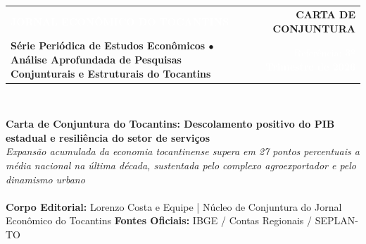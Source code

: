 \documentclass[10pt,a4paper]{article}
\begin{document}
\color{cinzatexto}

\\[-4pt]
\noindent{\color{douradoto}\rule{\textwidth}{1.2pt}}\\[-1pt]
\noindent\colorbox{corprimaria}{%
  \parbox{\dimexpr\textwidth-2\fboxsep\relax}{%
    \vspace{7pt}%
    \begin{tabularx}{\linewidth}{@{}X r@{}}
      {\fontsize{16}{19}\selectfont\textbf{\textcolor{white}{JORNAL ECONÔMICO DO TOCANTINS}}} &
      \colorbox{douradoto}{\textbf{\footnotesize\textcolor{corprimaria}{\hspace{6pt}CARTA DE CONJUNTURA\hspace{6pt}}}} \\[5pt]
      {\footnotesize\textcolor{douradoto}{\textbf{Série Periódica de Estudos Econômicos $\bullet$ Análise Aprofundada de Pesquisas Conjunturais e Estruturais do Tocantins}}} &
      {\footnotesize\textcolor{white}{Referência: \textbf{3º Trimestre de 2026}}}
    \end{tabularx}%
    \vspace{5pt}%
  }%
}\\[-2pt]
\noindent{\color{douradoto}\rule{\textwidth}{2.6pt}}

\vspace{6pt}

{\fontsize{16}{20}\selectfont\textbf{\textcolor{corprimaria}{Carta de Conjuntura do Tocantins: Descolamento positivo do PIB estadual e resiliência do setor de serviços}}}\\[4pt]
{\normalsize\textcolor{cinzasuave}{\textit{Expansão acumulada da economia tocantinense supera em 27 pontos percentuais a média nacional na última década, sustentada pelo complexo agroexportador e pelo dinamismo urbano}}}\\[5pt]
\noindent{\color{borda}\rule{\textwidth}{0.5pt}}\\[-1pt]
{\footnotesize\textcolor{corprimaria}{\textbf{Corpo Editorial:}} \textcolor{cinzatexto}{Lorenzo Costa e Equipe | Núcleo de Conjuntura do Jornal Econômico do Tocantins} \hfill \textcolor{corprimaria}{\textbf{Fontes Oficiais:}} \textcolor{cinzatexto}{IBGE / Contas Regionais / SEPLAN-TO}}\\[-3pt]
\noindent{\color{borda}\rule{\textwidth}{0.5pt}}
\end{document}
